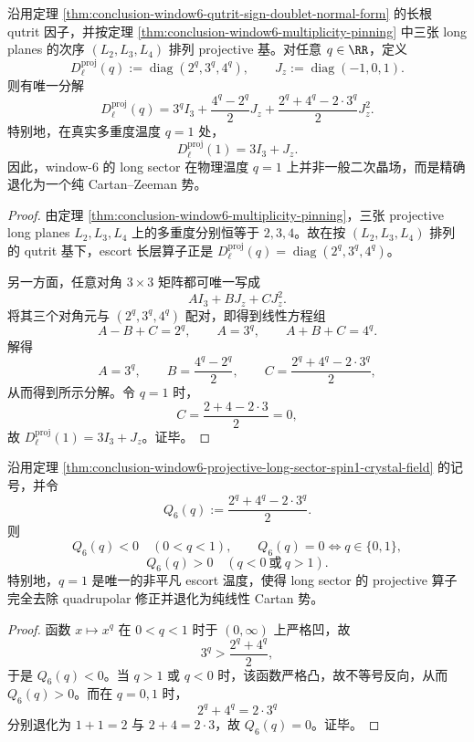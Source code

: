 \begin{theorem}\label{thm:conclusion-window6-projective-long-sector-spin1-crystal-field}
沿用定理 \ref{thm:conclusion-window6-qutrit-sign-doublet-normal-form} 的长根 qutrit 因子，并按定理 \ref{thm:conclusion-window6-multiplicity-pinning} 中三张 long planes 的次序 \((L_2,L_3,L_4)\) 排列 projective 基。对任意 \(q\in\RR\)，定义
\[
D_{\ell}^{\mathrm{proj}}(q):=\operatorname{diag}(2^q,3^q,4^q),
\qquad
J_z:=\operatorname{diag}(-1,0,1).
\]
则有唯一分解
\[
D_{\ell}^{\mathrm{proj}}(q)
=
3^q I_3
+\frac{4^q-2^q}{2}J_z
+\frac{2^q+4^q-2\cdot 3^q}{2}J_z^2.
\]
特别地，在真实多重度温度 \(q=1\) 处，
\[
D_{\ell}^{\mathrm{proj}}(1)=3I_3+J_z.
\]
因此，window-\(6\) 的 long sector 在物理温度 \(q=1\) 上并非一般二次晶场，而是精确退化为一个纯 Cartan--Zeeman 势。
\end{theorem}
\begin{proof}
由定理 \ref{thm:conclusion-window6-multiplicity-pinning}，三张 projective long planes \(L_2,L_3,L_4\) 上的多重度分别恒等于 \(2,3,4\)。故在按 \((L_2,L_3,L_4)\) 排列的 qutrit 基下，escort 长层算子正是
\(
D_{\ell}^{\mathrm{proj}}(q)=\operatorname{diag}(2^q,3^q,4^q)
\)。

另一方面，任意对角 \(3\times 3\) 矩阵都可唯一写成
\[
AI_3+BJ_z+CJ_z^2.
\]
将其三个对角元与 \((2^q,3^q,4^q)\) 配对，即得到线性方程组
\[
A-B+C=2^q,\qquad A=3^q,\qquad A+B+C=4^q.
\]
解得
\[
A=3^q,\qquad
B=\frac{4^q-2^q}{2},\qquad
C=\frac{2^q+4^q-2\cdot 3^q}{2},
\]
从而得到所示分解。令 \(q=1\) 时，
\[
C=\frac{2+4-2\cdot 3}{2}=0,
\]
故 \(D_{\ell}^{\mathrm{proj}}(1)=3I_3+J_z\)。证毕。
\end{proof}

\begin{corollary}\label{cor:conclusion-window6-projective-long-sector-quadrupole-sign}
沿用定理 \ref{thm:conclusion-window6-projective-long-sector-spin1-crystal-field} 的记号，并令
\[
Q_6(q):=\frac{2^q+4^q-2\cdot 3^q}{2}.
\]
则
\[
Q_6(q)<0\quad (0<q<1),\qquad
Q_6(q)=0\iff q\in\{0,1\},
\]
\[
Q_6(q)>0\quad (q<0\ \text{或}\ q>1).
\]
特别地，\(q=1\) 是唯一的非平凡 escort 温度，使得 long sector 的 projective 算子完全去除 quadrupolar 修正并退化为纯线性 Cartan 势。
\end{corollary}
\begin{proof}
函数 \(x\mapsto x^q\) 在 \(0<q<1\) 时于 \((0,\infty)\) 上严格凹，故
\[
3^q>\frac{2^q+4^q}{2},
\]
于是 \(Q_6(q)<0\)。当 \(q>1\) 或 \(q<0\) 时，该函数严格凸，故不等号反向，从而 \(Q_6(q)>0\)。而在 \(q=0,1\) 时，
\[
2^q+4^q=2\cdot 3^q
\]
分别退化为 \(1+1=2\) 与 \(2+4=2\cdot 3\)，故 \(Q_6(q)=0\)。证毕。
\end{proof}


